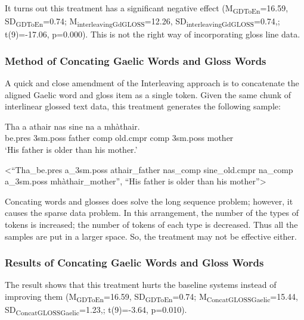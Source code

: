 \documentclass[11pt,a4paper]{article}
\begin{document}

It turns out this treatment has a significant negative effect
(M\textsubscript{GDToEn}=16.59, SD\textsubscript{GDToEn}=0.74; M\textsubscript{interleavingGdGLOSS}=12.26, SD\textsubscript{interleavingGdGLOSS}=0.74,; t(9)=-17.06, p=0.000). This is not the right way of incorporating gloss line data. 


\subsubsection{Method of Concating Gaelic Words and Gloss Words }\label{treatment:Concating}
A quick and close amendment of the Interleaving approach is to concatenate the aligned Gaelic word and gloss item as a single token. Given the same chunk of interlinear glossed text data, this treatment generates the following sample:

\begin{exe} 
\ex 
	\begin{xlist}
	\ex 
		\gll	 Tha a athair nas sine na a mh\`athair.\\  
     		     be.pres 3sm.poss father comp old.cmpr comp 3sm.poss mother \\
    	\glt    `His father is older than his mother.'  

    \ex <``Tha\_be.pres a\_3sm.poss athair\_father nas\_comp sine\_old.cmpr na\_comp a\_3sm.poss mh\`athair\_mother'', ``His father is older than his mother''>
    \end{xlist}
\end{exe}

Concating words and glosses does solve the long sequence problem; however, it causes the sparse data problem. In this arrangement, the number of the types of tokens is increased; the number of tokens of each type is decreased. Thus all the samples are put in a larger space. So, the treatment may not be effective either. 

\subsubsection{Results of Concating Gaelic Words and Gloss Words}

The result shows that this treatment hurts the baseline systems instead of improving them (M\textsubscript{GDToEn}=16.59, SD\textsubscript{GDToEn}=0.74; M\textsubscript{ConcatGLOSSGaelic}=15.44, SD\textsubscript{ConcatGLOSSGaelic}=1.23,; t(9)=-3.64, p=0.010).
\end{document}
